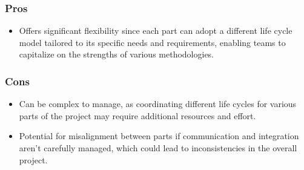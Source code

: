 \subsubsection{Pros}
\begin{itemize} 
\item Offers significant flexibility since each part can adopt a different life cycle model tailored to its specific needs
and requirements, enabling teams to capitalize on the strengths of various methodologies.
\end{itemize}
\subsubsection{Cons}
\begin{itemize}
\item Can be complex to manage, as coordinating different life cycles for various parts of the project may require additional
resources and effort.
\item Potential for misalignment between parts if communication and integration aren’t carefully managed, which could lead
to inconsistencies in the overall project.
\end{itemize}
